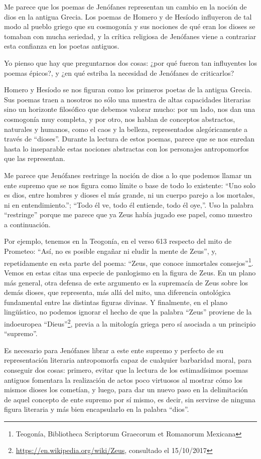 Me parece que los poemas de Jenófanes
representan un cambio en la noción de dios en
la antigua Grecia. Los poemas de Homero y de
Hesíodo influyeron de tal modo al pueblo
griego que su cosmogonía y sus nociones de
qué eran los dioses se tomaban con mucha
seriedad, y la crítica religiosa de Jenófanes
viene a contrariar esta confianza en los
poetas antiguos.

Yo pienso que hay que preguntarnos dos cosas:
¿por qué fueron tan influyentes los poemas
épicos?, y ¿en qué estriba la necesidad de
Jenófanes de criticarlos?

Homero y Hesíodo se nos figuran como los
primeros poetas de la antigua Grecia. Sus
poemas traen a nosotros no sólo una muestra
de altas capacidades literarias sino un
horizonte filosófico que debemos valorar
mucho: por un lado, nos dan una cosmogonía
muy completa, y por otro, nos hablan de
conceptos abstractos, naturales y humanos,
como el caos y la belleza, representados
alegóricamente a través de ``dioses''.
Durante la lectura de estos poemas, parece
que se nos enredan hasta lo inseparable estas
nociones abstractas con los personajes
antropomorfos que las representan.

Me parece que Jenófanes restringe la noción
de dios a lo que podemos llamar un ente
supremo que se nos figura como límite o base
de todo lo existente: ``Uno solo es dios,
entre hombres y dioses el más grande, ni un
cuerpo parejo a los mortales, ni en
entendimiento.''; ``Todo él ve, todo él
entiende, todo él oye,''. Uso la palabra
``restringe'' porque me parece que ya Zeus
había jugado ese papel, como muestro a
continuación.

Por ejemplo, tenemos en la Teogonía, en el
verso 613 respecto del mito de Prometeo:
``Así, no es posible engañar ni eludir la
mente de Zeus'', y, repetidamente en esta
parte del poema: ``Zeus, que conoce
inmortales consejos''\footnote{Teogonía,
Bibliotheca Scriptorum Graecorum et Romanorum
Mexicana}. Vemos en estas citas una especie
de panlogismo en la figura de Zeus. En un
plano más general, otra defensa de este
argumento es la supremacía de Zeus sobre los
demás dioses, que representa, más allá del
mito, una diferencia ontológica fundamental
entre las distintas figuras divinas. Y
finalmente, en el plano lingüístico, no
podemos ignorar el hecho de que la palabra
``Zeus'' proviene de la indoeuropea
``Dieus''\footnote{
\url{https://en.wikipedia.org/wiki/Zeus},
consultado el 15/10/2017}, previa a la
mitología griega pero sí asociada a un
principio ``supremo''.

Es necesario para Jenófanes librar a este
ente supremo y perfecto de su representación
literaria antropomorfa capaz de cualquier
barbaridad moral, para conseguir dos cosas:
primero, evitar que la lectura de los
estimadísimos poemas antiguos fomentara la
realización de actos poco virtuosos al
mostrar cómo los mismos dioses los cometían,
y luego, para dar un nuevo paso en la
delimitación de aquel concepto de ente
supremo por sí mismo, es decir, sin servirse
de ninguna figura literaria y más bien
encapsularlo en la palabra ``dios''.

